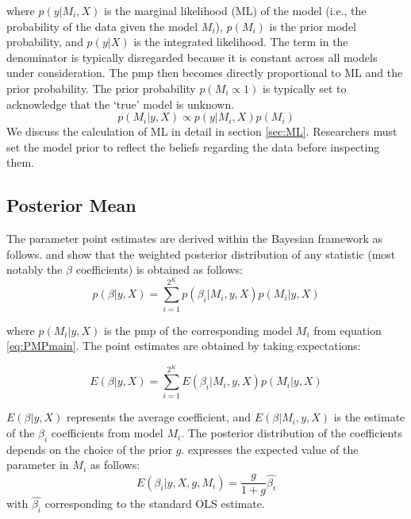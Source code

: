 \documentclass[a4paper,11pt]{article}
\begin{document}
where $p(y\vert M_{i},X)$ is the marginal likelihood (ML) of the model (i.e., the probability of the data given the model $M_{i}$), $p(M_{i})$ is the prior model probability, and $p(y\vert X)$ is the integrated likelihood. The term in the denominator is typically disregarded because it is constant across all models under consideration. The \ac{pmp} then becomes directly proportional to ML and the prior probability. The prior probability $p(M_{i} \propto 1)$ is typically set to acknowledge that the `true' model is unknown.
\begin{equation}
p(M_{i}\vert y,X) \propto p(y\vert M_{i},X)p(M_{i})
\end{equation}
%
We discuss the calculation of ML in detail in section \ref{sec:ML}. Researchers must set the model prior to reflect the beliefs regarding the data before inspecting them. 
%
\subsection*{Posterior Mean}
The parameter point estimates are derived within the Bayesian framework as follows. \citet{Zeugner2011} and \citet{MoralBenito2012} show that the weighted posterior distribution of any statistic (most notably the $\beta$ coefficients) is obtained as follows:
%
\begin{equation}\label{eq:parest}
p(\beta \vert y, X) = \sum_{i=1}^{2^{K}} p(\beta_{i} \vert M_{i},y,X)p(M_{i} \vert y,X)
\end{equation}

where $p(M_{i} \vert y, X)$ is the \ac{pmp} of the corresponding model $M_{i}$ from equation \ref{eq:PMPmain}. The point estimates are obtained by taking expectations:

\begin{equation}\label{eq:pointparest}
E(\beta \vert y, X) = \sum_{i=1}^{2^{K}} E(\beta_{i} \vert M_{i},y,X)p(M_{i} \vert y,X)
\end{equation}

$E(\beta \vert y, X)$ represents the average coefficient, and $E(\beta \vert M_{i},y,X)$ is the estimate of the $\beta_{i}$ coefficients from model $M_{i}$. The posterior distribution of the coefficients depends on the choice of the prior $g$. \citet{Zeugner2011} expresses the expected value of the parameter in $M_{i}$ as follows:
\begin{equation}\label{eq:postdist}
E(\beta_{i} \vert y,X,g,M_{i}) = \frac{g}{1+g}\hat{\beta_{i}}
\end{equation}
with $\hat{\beta_{i}}$ corresponding to the standard OLS estimate.
\end{document}
